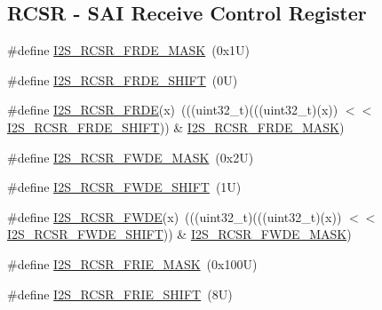 \subsection*{R\+C\+SR -\/ S\+AI Receive Control Register}
\begin{DoxyCompactItemize}
\item 
\#define \mbox{\hyperlink{group___i2_s___register___masks_gaf82cfc347ee6a04baec92ebf5198b06c}{I2\+S\+\_\+\+R\+C\+S\+R\+\_\+\+F\+R\+D\+E\+\_\+\+M\+A\+SK}}~(0x1\+U)
\item 
\#define \mbox{\hyperlink{group___i2_s___register___masks_ga989180bd00d082c32921f39944f70c01}{I2\+S\+\_\+\+R\+C\+S\+R\+\_\+\+F\+R\+D\+E\+\_\+\+S\+H\+I\+FT}}~(0\+U)
\item 
\#define \mbox{\hyperlink{group___i2_s___register___masks_ga93476dee09249d87aeb1baa1b408bcac}{I2\+S\+\_\+\+R\+C\+S\+R\+\_\+\+F\+R\+DE}}(x)~(((uint32\+\_\+t)(((uint32\+\_\+t)(x)) $<$$<$ \mbox{\hyperlink{group___i2_s___register___masks_ga989180bd00d082c32921f39944f70c01}{I2\+S\+\_\+\+R\+C\+S\+R\+\_\+\+F\+R\+D\+E\+\_\+\+S\+H\+I\+FT}})) \& \mbox{\hyperlink{group___i2_s___register___masks_gaf82cfc347ee6a04baec92ebf5198b06c}{I2\+S\+\_\+\+R\+C\+S\+R\+\_\+\+F\+R\+D\+E\+\_\+\+M\+A\+SK}})
\item 
\#define \mbox{\hyperlink{group___i2_s___register___masks_gaba9d1c2766ec4f47df5ea6316e050cd0}{I2\+S\+\_\+\+R\+C\+S\+R\+\_\+\+F\+W\+D\+E\+\_\+\+M\+A\+SK}}~(0x2\+U)
\item 
\#define \mbox{\hyperlink{group___i2_s___register___masks_gac9c4253d0b73811583bb620a5f61f1ad}{I2\+S\+\_\+\+R\+C\+S\+R\+\_\+\+F\+W\+D\+E\+\_\+\+S\+H\+I\+FT}}~(1\+U)
\item 
\#define \mbox{\hyperlink{group___i2_s___register___masks_gad238520fd9565eeeddc5f6a6b74536db}{I2\+S\+\_\+\+R\+C\+S\+R\+\_\+\+F\+W\+DE}}(x)~(((uint32\+\_\+t)(((uint32\+\_\+t)(x)) $<$$<$ \mbox{\hyperlink{group___i2_s___register___masks_gac9c4253d0b73811583bb620a5f61f1ad}{I2\+S\+\_\+\+R\+C\+S\+R\+\_\+\+F\+W\+D\+E\+\_\+\+S\+H\+I\+FT}})) \& \mbox{\hyperlink{group___i2_s___register___masks_gaba9d1c2766ec4f47df5ea6316e050cd0}{I2\+S\+\_\+\+R\+C\+S\+R\+\_\+\+F\+W\+D\+E\+\_\+\+M\+A\+SK}})
\item 
\#define \mbox{\hyperlink{group___i2_s___register___masks_ga97cd414600a5d5077af214ef0c166dc0}{I2\+S\+\_\+\+R\+C\+S\+R\+\_\+\+F\+R\+I\+E\+\_\+\+M\+A\+SK}}~(0x100\+U)
\item 
\#define \mbox{\hyperlink{group___i2_s___register___masks_ga4f7d0729441e65e811ddbcf701db7692}{I2\+S\+\_\+\+R\+C\+S\+R\+\_\+\+F\+R\+I\+E\+\_\+\+S\+H\+I\+FT}}~(8\+U)

\end{DoxyCompactItemize}
